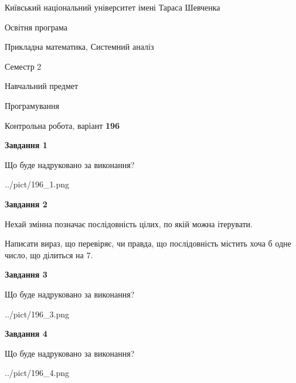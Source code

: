 \documentclass[12pt, ukrainian]{article}
\begin{document}
{{\begin {small}\par
{ \center  Київський національний університет імені Тараса Шевченка \par}
{\parbox {5 cm}{Освітня програма \hfill}{\parbox {8 cm}{Прикладна математика, Системний аналіз \hfill}}\parbox {5 cm}{\hfill Семестр 2}}\par
{\parbox {5 cm} {Навчальний предмет \hfill}\parbox {7 cm}{Програмування \hfill}\parbox {6cm}{\hfill}\par}\vspace{-7pt} \end{small}}{\center Контрольна робота, варіант  \No \textbf
{ 196 }\par}}
{
\begin {large}
{\begin {center}\textbf{Завдання 1}\end {center}}\par
Що буде надруковано за виконання?\par\par
\begin{center}
	{../pict/196_1.png}
\end{center}
\newpage

{\begin {center}\textbf{Завдання 2}\end {center}}\par
Нехай змінна  позначає послідовність цілих, по якій можна ітерувати.

Написати вираз, що перевіряє, чи правда, що послідовність  містить хоча б одне число, що ділиться на 7.\par
\newpage

{\begin {center}\textbf{Завдання 3}\end {center}}\par
Що буде надруковано за виконання?
\begin{center}
	{../pict/196_3.png}
\end{center}
\newpage

{\begin {center}\textbf{Завдання 4}\end {center}}\par
Що буде надруковано за виконання?\par
\begin{center}
	{../pict/196_4.png}
\end{center}
\newpage


\end{large}}
\end{document}
